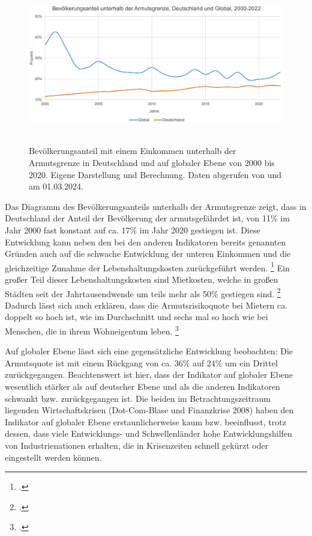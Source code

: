 \begin{figure}[h]
    \centering
    \includegraphics[height=6.9cm]{Bilder/Armutsgrenze2.png}
    \caption[Bevölkerungsanteil unterhalb der Armutsgrenze, Deutschland und global, 2000-2020]{Bevölkerungsanteil mit einem Einkommen unterhalb der Armutsgrenze in Deutschland und auf globaler Ebene von 2000 bis 2020. Eigene Darstellung und Berechnung. Daten abgerufen von \cite[][(global)]{wb_armutsquote_global_2022} und \cite[][(Deutschland)]{bmas_arb_armutsrisikoquote_2023} am 01.03.2024.}
    \label{fig:iso_norm}
\end{figure}

Das Diagramm des Bevölkerungsanteils unterhalb der Armutsgrenze zeigt, dass in Deutschland der Anteil der Bevölkerung der armutsgefährdet ist, von 11\% im Jahr 2000 fast konstant auf ca. 17\% im Jahr 2020 gestiegen ist. Diese Entwicklung kann neben den bei den anderen Indikatoren bereits genannten Gründen auch auf die schwache Entwicklung der unteren Einkommen und die gleichzeitige Zunahme der Lebenshaltungskosten zurückgeführt werden. \footcite[Vgl. ][S. 17 (Country-Sheets)]{wir_2022} Ein gro{\ss}er Teil dieser Lebenshaltungskosten sind Mietkosten, welche in gro{\ss}en Städten seit der Jahrtausendwende um teils mehr als 50\% gestiegen sind. \footcite[Vgl. ][S. 494]{kholodilin_mietpreisbremse_2016} Dadurch lässt sich auch erklären, dass die Armutsrisikoquote bei Mietern ca. doppelt so hoch ist, wie im Durchschnitt und sechs mal so hoch wie bei Menschen, die in ihrem Wohneigentum leben. \footcite[Vgl. ][S. 458]{grabka_einkommensverteilung_2018}

Auf globaler Ebene lässt sich eine gegensätzliche Entwicklung beobachten: Die Armutsquote ist mit einem Rückgang von ca. 36\% auf 24\% um ein Drittel zurückgegangen. Beachtenswert ist hier, dass der Indikator auf globaler Ebene wesentlich stärker als auf deutscher Ebene und als die anderen Indikatoren schwankt bzw. zurückgegangen ist. Die beiden im Betrachtungszeitraum liegenden Wirtschaftskrisen (Dot-Com-Blase und Finanzkrise 2008) haben den Indikator auf globaler Ebene erstaunlicherweise kaum  bzw. beeinflusst, trotz dessen, dass viele Entwicklungs- und Schwellenländer hohe Entwicklungshilfen von Industrienationen erhalten, die in Krisenzeiten schnell gekürzt oder eingestellt werden können.

